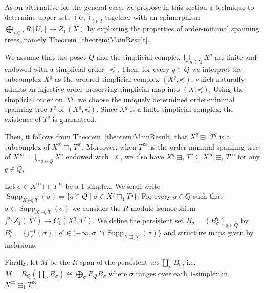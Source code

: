 \documentclass[oneside]{amsart}
\theoremstyle{definition}
\DeclareMathOperator\Supp{Supp}
\begin{document}
As an alternative for the general case, we propose in this section a technique to determine upper sets $(U_i)_{i \in I}$ together with an epimorphism $\bigoplus_{i \in I} R[U_i] \to Z_1(X)$ by exploiting the properties of order-minimal spanning trees, namely Theorem~\ref{theorem:MainResult}.

We assume that the poset $Q$ and the simplicial complex $\bigcup_{q \in Q} X^q$ are finite and endowed with a simplicial order~$\preceq$.
Then, for every $q \in Q$ we interpret the subcomplex $X^q$ as the ordered simplicial complex $(X^q, \mathord\preceq)$, which naturally admits an injective order-preserving simplicial map into $(X, \mathord\preceq)$.
Using the simplicial order on $X^q$, we choose the uniquely determined order-minimal spanning tree $T^q$ of $(X^q, \mathord\preceq)$.
Since $X^q$ is a finite simplicial complex, the existence of $T^q$ is guaranteed.

Then, it follows from Theorem~\ref{theorem:MainResult} that $X^q \boxminus_1 T^q$ is a subcomplex of $X^{q'} \boxminus_1 T^{q'}$.
Moreover, when $T^\infty$ is the order-minimal spanning tree of $X^\infty = \bigcup_{q \in Q} X^q$ endowed with $\preceq$, we also have $X^q \boxminus_1 T^q \subseteq X^\infty \boxminus_1 T^\infty$ for any $q \in Q$.

Let $\sigma \in X^\infty \boxminus_1 T^\infty$ be a 1-simplex.
We shall write $\Supp_{X \boxminus_1 T}(\sigma) = \{ q \in Q \mid \sigma \in X^q \boxminus_1 T^q \}$.
For every $q \in Q$ such that $\sigma \in \Supp_{X \boxminus_1 T}(\sigma)$ we consider the $R$-module isomorphism $j^q\colon Z_1(X^q) \to C_1(X^q, T^q)$.
We define the persistent set $B_\sigma = (B_\sigma^q)_{q \in Q}$ by $B_\sigma^q = \{ j^{-1}_{q'}(\sigma) \mid q' \in (- \infty, \sigma] \cap \Supp_{X \boxminus_1 T}(\sigma) \}$ and structure maps given by inclusions.

Finally, let $M$ be the $R$-span of the persistent set $\coprod_{\sigma} B_\sigma$, i.e.\ $M = R_Q(\coprod_\sigma B_\sigma) \cong \bigoplus_\sigma R_Q B_\sigma$ where $\sigma$ ranges over each $1$-simplex in $X^\infty \boxminus_1 T^\infty$.
\end{document}
